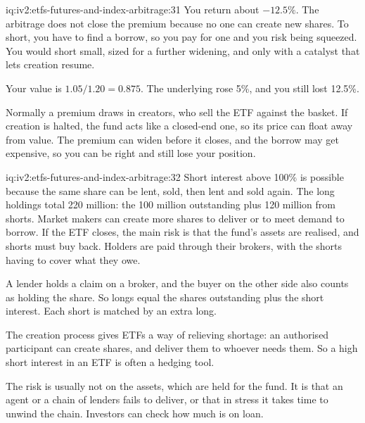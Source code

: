 \begin{solution}{iq:iv2:etfs-futures-and-index-arbitrage:31}
You return about $-12.5\%$. The arbitrage does not close the premium because no one can create new shares. To short, you have to find a borrow, so you pay for one and you risk being squeezed. You would short small, sized for a further widening, and only with a catalyst that lets creation resume.

Your value is $1.05/1.20 = 0.875$. The underlying rose 5\%, and you still lost 12.5\%.

Normally a premium draws in creators, who sell the ETF against the basket. If creation is halted, the fund acts like a closed-end one, so its price can float away from value. The premium can widen before it closes, and the borrow may get expensive, so you can be right and still lose your position.

\end{solution}

\begin{solution}{iq:iv2:etfs-futures-and-index-arbitrage:32}
Short interest above 100\% is possible because the same share can be lent, sold, then lent and sold again. The long holdings total 220 million: the 100 million outstanding plus 120 million from shorts. Market makers can create more shares to deliver or to meet demand to borrow. If the ETF closes, the main risk is that the fund's assets are realised, and shorts must buy back. Holders are paid through their brokers, with the shorts having to cover what they owe.

A lender holds a claim on a broker, and the buyer on the other side also counts as holding the share. So longs equal the shares outstanding plus the short interest. Each short is matched by an extra long.

The creation process gives ETFs a way of relieving shortage: an authorised participant can create shares, and deliver them to whoever needs them. So a high short interest in an ETF is often a hedging tool.

The risk is usually not on the assets, which are held for the fund. It is that an agent or a chain of lenders fails to deliver, or that in stress it takes time to unwind the chain. Investors can check how much is on loan.

\end{solution}

